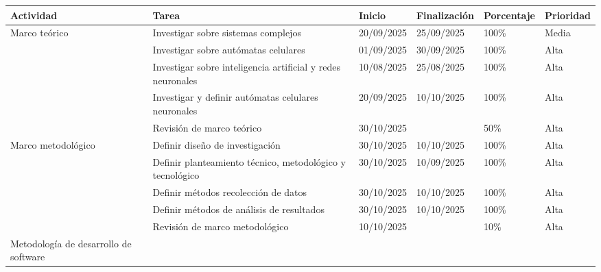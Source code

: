 \documentclass[letterpaper,10pt,oneside]{article}
\begin{document}
\begin{table}[htbp]
	\centering
	\begin{tabular}{|p{}|p{}|p{}|p{}|p{}|p{}|}
		\hline
		\textbf{Actividad} & 
		\textbf{Tarea} &  
		\textbf{Inicio} & 
		\textbf{Finalización} & 
		\textbf{Porcentaje} & 
		\textbf{Prioridad} \\
		\hline

		\multirow{5}{0.15\textwidth}{\parbox{0.15\textwidth}{\centering Marco teórico}} 
		
		& Investigar sobre sistemas complejos & 20/09/2025 & 25/09/2025 & 100\% & Media \\ \cline{2-6}
		
		& Investigar sobre autómatas celulares & 01/09/2025 & 30/09/2025 & 100\% & Alta \\ \cline{2-6}
		
		& Investigar sobre inteligencia artificial y redes neuronales & 10/08/2025 & 25/08/2025 & 100\% & Alta \\ \cline{2-6}
		
		& Investigar y definir autómatas celulares neuronales & 20/09/2025 & 10/10/2025 & 100\% & Alta \\ \cline{2-6}
		
		& Revisión de marco teórico & 30/10/2025 &  & 50\% & Alta  \\ \hline
		
		\multirow{5}{0.15\textwidth}{\parbox{0.15\textwidth}{\centering Marco metodológico}} 
		
		& Definir diseño de investigación & 30/10/2025& 10/10/2025 & 100\% & Alta \\  \cline{2-6}
		
		& Definir planteamiento técnico, metodológico y tecnológico & 30/10/2025 & 10/09/2025 & 100\% & Alta \\  \cline{2-6}
		
		& Definir métodos recolección de datos & 30/10/2025 & 10/10/2025 & 100\% & Alta \\  \cline{2-6}
		
		& Definir métodos de análisis de resultados & 30/10/2025 & 10/10/2025 & 100\% & Alta \\ \cline{2-6}
		
		& Revisión de marco metodológico & 10/10/2025 &  & 10\% & Alta  \\ \hline
		
		\multirow{3}{0.15\textwidth}{\parbox{0.15\textwidth}{\centering Metodología de desarrollo de software}} 
		

\end{tabular}
\end{table}
\end{document}
